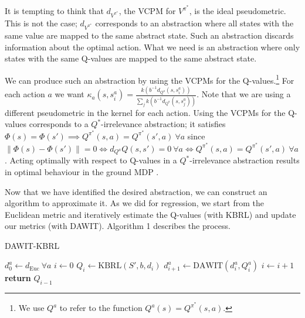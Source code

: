\documentclass{article} %
\begin{document}
It is tempting to think that $d_{V^{\pi^*}}$, the VCPM for $V^{\pi^*}$, is the ideal pseudometric.
This is not the case; $d_{V^{\pi^*}}$ corresponds to an abstraction where all states with the same
value are mapped to the same abstract state.
Such an abstraction discards information about the optimal action.
What we need is an abstraction where only states with the same Q-values are mapped to the
same abstract state.

We can produce such an abstraction by using the VCPMs for the Q-values.\footnote{We
use $Q^a$ to refer to the function $Q^a(s) = Q^{\pi^*}(s,a)$.}
For each action $a$ we want
$\kappa_a(s,s^a_i) = \frac{k(b^{-1}d_{Q^a}(s,s^a_i))}{\sum_j k(b^{-1}d_{Q^a}(s,s^a_j))}$.
Note that we are using a different pseudometric in the kernel for each action.
Using the VCPMs for the Q-values corresponds to a $Q^*$-irrelevance abstraction;
it satisfies $\Phi(s) = \Phi(s') \implies Q^{\pi^*}(s,a) = Q^{\pi^*}(s',a)\ \forall a$
since $\|\Phi(s) - \Phi(s')\| = 0 \iff d_{Q^a}Q(s,s') = 0\ \forall a \iff
Q^{\pi^*}(s,a) = Q^{\pi^*}(s',a)\ \forall a$.
Acting optimally with respect to Q-values in a $Q^*$-irrelevance abstraction
results in optimal behaviour in the ground MDP \cite{lietal}.

Now that we have identified the desired abstraction, we can construct an algorithm to
approximate it.
As we did for regression, we start from the Euclidean metric and iteratively estimate
the Q-values (with KBRL) and update our metrics (with DAWIT).
Algorithm 1 describes the process.

\begin{algorithm}
\caption{DAWIT-KBRL}\label{dkbrl}
\begin{algorithmic}[1]
	\State $d^a_0 \gets d_{\mathrm{Euc}}\ \forall a$
	\State $i \gets 0$
	\Repeat
		\State $Q_{i} \gets \mathrm{KBRL}(S', b, d_{i})$
                    \State $d^a_{i+1} \gets \mathrm{DAWIT}(d^a_i, Q^a_{i})$
                \EndFor
		\State $i \gets i+1$
	\State \textbf{return} $Q_{i-1}$
\EndProcedure
\end{algorithmic}
\end{algorithm}
\end{document}
